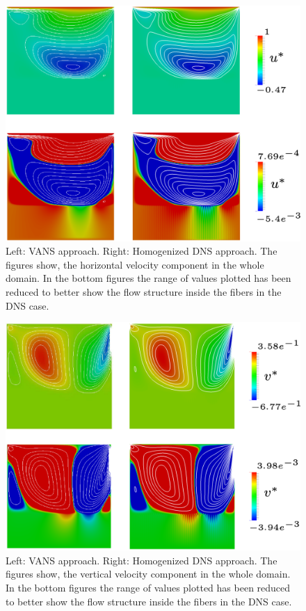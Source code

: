 \begin{figure}
	\centering
	\includegraphics[width=0.9\linewidth]{chapter_5/figure/re_100_big/ux}
	\caption{Left: VANS approach. Right: Homogenized DNS approach. The figures show, the horizontal velocity component in the whole domain. In the bottom figures the range of values plotted has been reduced to better show the flow structure inside the fibers in the DNS case.}
	\label{fig:ux}
\end{figure}

\begin{figure}
	\centering
	\includegraphics[width=0.9\linewidth]{chapter_5/figure/re_100_big/uy}
	\caption{Left: VANS approach. Right: Homogenized DNS approach. The figures show, the vertical velocity component in the whole domain. In the bottom figures the range of values plotted has been reduced to better show the flow structure inside the fibers in the DNS case.}
	\label{fig:uy}
\end{figure}


